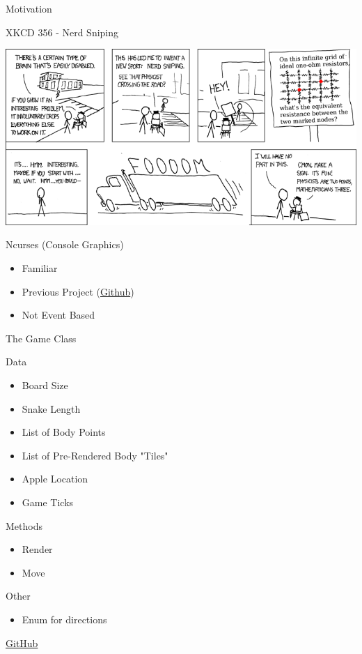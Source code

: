 \documentclass[presentation,bigger]{beamer}
\begin{document}
\begin{frame}[label={sec:orgc15e6e0}]{Motivation}
\begin{block}{XKCD 356 - Nerd Sniping}
\begin{center}
\includegraphics[width=.9\linewidth]{./nerd_sniping.png}
\end{center}
\end{block}
\end{frame}
\begin{frame}[label={sec:orgcbca53d}]{Ncurses (Console Graphics)}
\begin{itemize}
\item Familiar
\item Previous Project (\color{blue}\href{https://github.com/unDeadHerbs/Console-IO}{Github}\color{black})
\item Not Event Based
\end{itemize}
\end{frame}
\begin{frame}[label={sec:org7c52473}]{The Game Class}
\begin{block}{Data}
\begin{itemize}
\item Board Size
\item Snake Length
\item List of Body Points
\item List of Pre-Rendered Body "Tiles"
\item Apple Location
\item Game Ticks
\end{itemize}
\end{block}
\begin{block}{Methods}
\begin{itemize}
\item Render
\item Move
\end{itemize}
\end{block}
\begin{block}{Other}
\begin{itemize}
\item Enum for directions
\end{itemize}


\begin{flushright}
\color{blue}\href{https://github.com/unDeadHerbs/Snek\_player/blob/master/snek\_game.hpp}{GitHub}
\end{flushright}
\end{block}
\end{frame}
\end{document}
